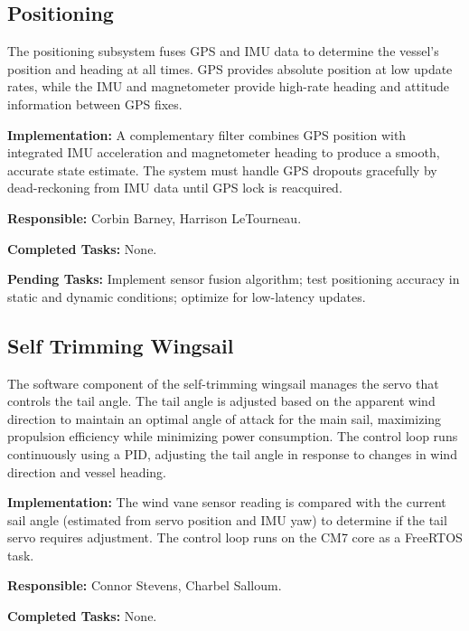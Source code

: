 
\subsection{Positioning}

The positioning subsystem fuses GPS and IMU data to determine the vessel's position and heading at all times. GPS provides absolute position at low update rates, while the IMU and magnetometer provide high-rate heading and attitude information between GPS fixes.

\textbf{Implementation:} A complementary filter combines GPS position with integrated IMU acceleration and magnetometer heading to produce a smooth, accurate state estimate. The system must handle GPS dropouts gracefully by dead-reckoning from IMU data until GPS lock is reacquired.

\textbf{Responsible:} Corbin Barney, Harrison LeTourneau.

\textbf{Completed Tasks:} None.

\textbf{Pending Tasks:} Implement sensor fusion algorithm; test positioning accuracy in static and dynamic conditions; optimize for low-latency updates.


\subsection{Self Trimming Wingsail}

The software component of the self-trimming wingsail manages the servo that controls the tail angle. The tail angle is adjusted based on the apparent wind direction to maintain an optimal angle of attack for the main sail, maximizing propulsion efficiency while minimizing power consumption. The control loop runs continuously using a PID, adjusting the tail angle in response to changes in wind direction and vessel heading.

\textbf{Implementation:} The wind vane sensor reading is compared with the current sail angle (estimated from servo position and IMU yaw) to determine if the tail servo requires adjustment. The control loop runs on the CM7 core as a FreeRTOS task.

\textbf{Responsible:} Connor Stevens, Charbel Salloum.

\textbf{Completed Tasks:} None.

